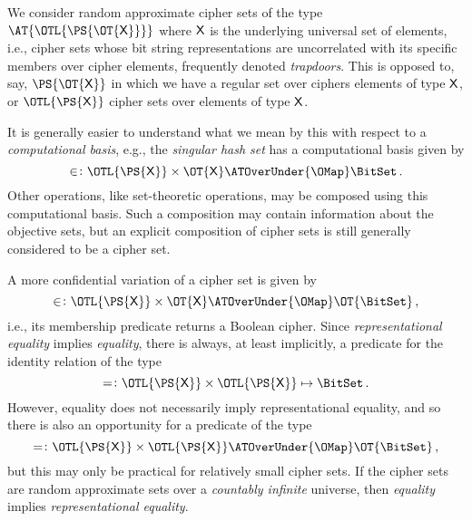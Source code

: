 \documentclass[ ../main.tex]{subfiles}
\begin{document}
We consider random approximate cipher sets of the type $\AT{\OTL{\PS{\OT{\Set{X}}}}}$ where $\Set{X}$ is the underlying universal set of elements, i.e., cipher sets whose bit string representations are uncorrelated with its specific members over cipher elements, frequently denoted \emph{trapdoors}.
This is opposed to, say, $\PS{\OT{\Set{X}}}$ in which we have a regular set over ciphers elements of type $\Set{X}$, or $\OTL{\PS{\Set{X}}}$ cipher sets over elements of type $\Set{X}$.

It is generally easier to understand what we mean by this with respect to a \emph{computational basis}, e.g., the 
\emph{singular hash set} has a computational basis given by
\begin{equation}
	\SetContains \colon \OTL{\PS{\Set{X}}} \times \OT{\Set{X}} \ATOverUnder{\OMap} \BitSet\,.
\end{equation}
Other operations, like set-theoretic operations, may be composed using this computational basis.
Such a composition may contain information about the objective sets, but an explicit composition of cipher sets is still generally considered to be a cipher set.

A more confidential variation of a cipher set is given by
\begin{equation}
	\SetContains \colon \OTL{\PS{\Set{X}}} \times \OT{\Set{X}} \ATOverUnder{\OMap} \OT{\BitSet}\,,
\end{equation}
i.e., its membership predicate returns a Boolean cipher.
Since \emph{representational equality} implies \emph{equality}, there is always, at least implicitly, a predicate for the identity relation of the type
\begin{equation}
	= \colon \OTL{\PS{\Set{X}}} \times \OTL{\PS{\Set{X}}} \mapsto \BitSet\,.
\end{equation}
However, equality does not necessarily imply representational equality, and so there is also an opportunity for a predicate of the type
\begin{equation}
	= \colon \OTL{\PS{\Set{X}}} \times \OTL{\PS{\Set{X}}} \ATOverUnder{\OMap} \OT{\BitSet}\,,
\end{equation}
but this may only be practical for relatively small cipher sets.
If the cipher sets are random approximate sets over a \emph{countably infinite} universe, then \emph{equality} implies \emph{representational equality}.
\end{document}
